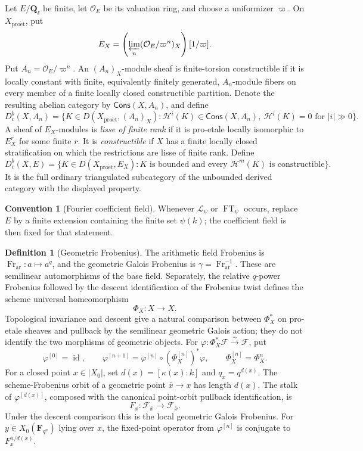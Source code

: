 \documentclass[10pt]{article}
\theoremstyle{definition}
\newtheorem{definition}[theorem]{Definition}
\newtheorem{convention}[theorem]{Convention}
\newcommand{\Ql}{\mathbf Q_\ell}
\newcommand{\Dbc}{D^b_c}
\newcommand{\Fr}{\operatorname{Fr}}
\begin{document}
Let \(E/\Ql\) be finite, let \(\mathcal O_E\) be its valuation ring, and
choose a uniformizer \(\varpi\).  On \(X_{\mathrm{pro\acute et}}\), put
\[
 E_X=\left(\varprojlim_n(\mathcal O_E/\varpi^n)_X\right)[1/\varpi].
\]
Put \(A_n=\mathcal O_E/\varpi^n\).  An \((A_n)_X\)-module sheaf is
finite-torsion constructible if it is locally constant with finite,
equivalently finitely generated, \(A_n\)-module fibers on every member of a
finite locally closed constructible partition.  Denote the resulting
abelian category by \(\mathsf{Cons}(X,A_n)\), and define
\[
 D^b_c(X,A_n)=
 \{K\in D(X_{\mathrm{pro\acute et}},(A_n)_X):
   \mathcal H^i(K)\in\mathsf{Cons}(X,A_n),\ 
   \mathcal H^i(K)=0\text{ for }|i|\gg0\}.
\]
A sheaf of \(E_X\)-modules is \emph{lisse of finite rank} if it is
pro-etale locally isomorphic to \(E_X^r\) for some finite \(r\).  It is
\emph{constructible} if \(X\) has a finite locally closed stratification on
which the restrictions are lisse of finite rank.  Define
\[
 \Dbc(X,E)=
 \{K\in D(X_{\mathrm{pro\acute et}},E_X):
 K\text{ is bounded and every }\mathcal H^m(K)\text{ is constructible}\}.
\]
It is the full ordinary triangulated subcategory of the unbounded derived
category with the displayed property.

\begin{convention}[Fourier coefficient field]
Whenever \(\mathcal L_\psi\) or \(\operatorname{FT}_\psi\) occurs, replace
\(E\) by a finite extension containing the finite set \(\psi(k)\); the
coefficient field is then fixed for that statement.
\end{convention}

\begin{definition}[Geometric Frobenius]
The arithmetic field Frobenius is
\(\Fr_{\mathrm{ar}}:a\mapsto a^q\), and the geometric Galois Frobenius is
\(\gamma=\Fr_{\mathrm{ar}}^{-1}\).  These are semilinear automorphisms of
the base field.  Separately, the relative \(q\)-power Frobenius followed by
the descent identification of the Frobenius twist defines the scheme
universal homeomorphism
\[
                       \Phi_X:X\longrightarrow X.
\]
Topological invariance and descent give a natural comparison between
\(\Phi_X^*\) on pro-etale sheaves and pullback by the semilinear geometric
Galois action; they do not identify the two morphisms of geometric objects.
For \(\varphi:\Phi_X^*\mathcal F\xrightarrow{\sim}\mathcal F\), put
\[
 \varphi^{[0]}=\operatorname{id},\qquad
 \varphi^{[n+1]}=\varphi^{[n]}\circ(\Phi_X^{[n]})^*\varphi,
 \qquad \Phi_X^{[n]}=\Phi_X^n.
\]
For a closed point \(x\in|X_0|\), set
\(d(x)=[\kappa(x):k]\) and \(q_x=q^{d(x)}\).  The scheme-Frobenius orbit
of a geometric point \(\bar x\to x\) has length \(d(x)\).  The stalk of
\(\varphi^{[d(x)]}\), composed with the canonical point-orbit pullback
identification, is
\[
                  F_x:\mathcal F_{\bar x}\longrightarrow
                       \mathcal F_{\bar x}.
\]
Under the descent comparison this is the local geometric Galois Frobenius.
For \(y\in X_0(\mathbf F_{q^n})\) lying over \(x\), the fixed-point
operator from \(\varphi^{[n]}\) is conjugate to \(F_x^{n/d(x)}\).
\end{definition}
\end{document}
